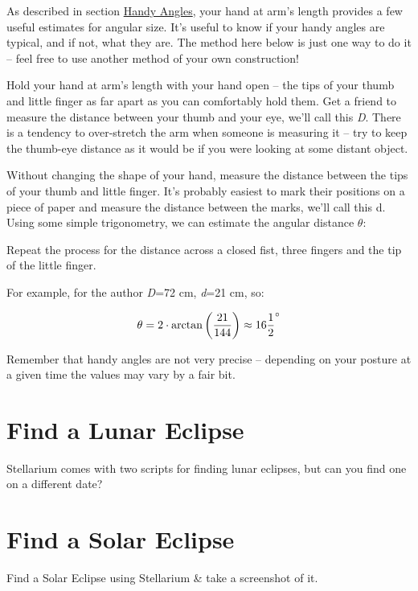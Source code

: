 As described in section \href{Exercises\#Handy_Angles}{Handy Angles},
your hand at arm's length provides a few useful estimates for angular
size. It's useful to know if your handy angles are typical, and if not,
what they are. The method here below is just one way to do it -- feel
free to use another method of your own construction!

Hold your hand at arm's length with your hand open -- the tips of your
thumb and little finger as far apart as you can comfortably hold them.
Get a friend to measure the distance between your thumb and your eye,
we'll call this \emph{D}. There is a tendency to over-stretch the arm
when someone is measuring it -- try to keep the thumb-eye distance as it
would be if you were looking at some distant object.

Without changing the shape of your hand, measure the distance between
the tips of your thumb and little finger. It's probably easiest to mark
their positions on a piece of paper and measure the distance between the
marks, we'll call this d. Using some simple trigonometry, we can
estimate the angular distance $\theta$:

Repeat the process for the distance across a closed fist, three fingers
and the tip of the little finger.

For example, for the author \emph{D}=72 cm, \emph{d}=21 cm, so:

\begin{equation}
\theta = 2 \cdot \arctan{\left( \dfrac{21}{144} \right)} \approx 16\frac{1}{2}\degree
\end{equation}

Remember that handy angles are not very precise -- depending on your
posture at a given time the values may vary by a fair bit.

\section{Find a Lunar Eclipse}\label{find-a-lunar-eclipse}

Stellarium comes with two scripts for finding lunar eclipses, but can
you find one on a different date?

\section{Find a Solar Eclipse}\label{find-a-solar-eclipse}

Find a Solar Eclipse using Stellarium \& take a screenshot of it.